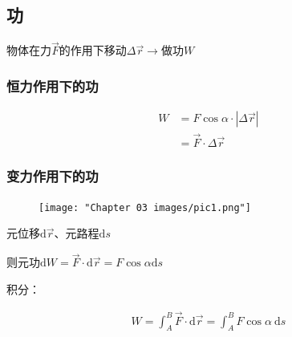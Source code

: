 \documentclass[
	12pt, %
	a4paper, %
]{myLegrandOrangeBook}
\newcommand{\rmd}{\mathrm{d}}
\begin{document}
    \subsection{功}

    物体在力\(\overrightarrow{F}\)的作用下移动\(\Delta \overrightarrow{r} \rightarrow\)做功\(W\)

    \subsubsection*{恒力作用下的功}

    \begin{equation}
        \begin{aligned}
        W & =F \cos \alpha \cdot|\Delta \overrightarrow{r}| \\
        & =\overrightarrow{F} \cdot \Delta \overrightarrow{r}
        \end{aligned}
    \end{equation}

    \subsubsection*{变力作用下的功}

    \begin{figure}
        \centering
        \texttt{[image: "Chapter 03 images/pic1.png"]}
        \label{pic1}
    \end{figure}

    元位移\(\rmd \overrightarrow{r}\)、元路程\(\rmd s\)

    则元功\(\rmd W = \overrightarrow{F} \cdot \rmd \overrightarrow{r} =
    F \cos \alpha \rmd s\)

    积分：

    \begin{align}
        W=\int_A^B \overrightarrow{F} \cdot \rmd \overrightarrow{r}=\int_A^B F \cos \alpha \mathrm{~d} s
    \end{align}
\end{document}
